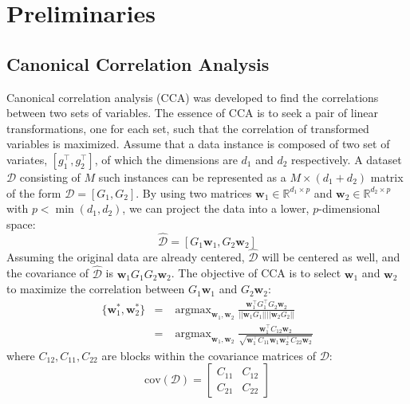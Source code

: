 \documentclass[a4paper]{article}
\newcommand{\argmax}{\mathop\mathrm{argmax}}
\begin{document}
\section{Preliminaries}
\label{sec:pre}

\subsection{Canonical Correlation Analysis}
\label{subsec:CCA}
Canonical correlation analysis (CCA) \cite{HardoonSS04} was developed to find the correlations between two sets of variables. The essence of CCA is to seek a pair of 
linear transformations, one for each set, such that the correlation of transformed variables is maximized. 
Assume that a data instance is composed of two set of variates, $[g_1^\top,g_2^\top]$, of which the dimensions are $d_1$ and $d_2$ respectively.  
A dataset $\mathcal{D}$ consisting of $M$ such instances can be represented as a $M\times (d_1+d_2)$ matrix of the form $\mathcal{D}=[G_1,G_2]$. By using two matrices 
$\mathbf{w}_1\in\mathbb{R}^{d_1\times p}$ and $\mathbf{w}_2\in\mathbb{R}^{d_2\times p}$ with $p<\min(d_1,d_2)$, we can project the data into a lower, $p$-dimensional space:
\begin{equation}
    \hat{\mathcal{D}}= [G_1\mathbf{w}_1, G_2\mathbf{w}_2] 
\end{equation}
Assuming the original data are already centered, $\hat{\mathcal{D}}$ will be centered as well, and the covariance of $\hat{\mathcal{D}}$ is $\mathbf{w}_1 G_1 G_2 \mathbf{w}_2$. 
The objective of CCA is to select $\mathbf{w}_1$ and $\mathbf{w}_2$ to maximize the correlation between $G_1\mathbf{w}_1$ and $G_2\mathbf{w}_2$:
\begin{equation}
    \begin{array}{rcl}
        \{\mathbf{w}_1^*,\mathbf{w}_2^*\} &= &\displaystyle\argmax_{\mathbf{w}_1,\mathbf{w}_2} \frac{\mathbf{w}_1^\top G_1^\top G_2 \mathbf{w}_2}{||\mathbf{w}_1 G_1||||\mathbf{w}_2 G_2||} \\ 
                                          &= & \displaystyle\argmax_{\mathbf{w}_1,\mathbf{w}_2} \frac{\mathbf{w}_1^\top C_{12} \mathbf{w}_2}{\sqrt{\mathbf{w}_1^\top C_{11} \mathbf{w}_1 \mathbf{w}_2^\top C_{22} \mathbf{w}_2}}
    \end{array}
    \label{equ:CCA1}
\end{equation}
where $C_{12}, C_{11}, C_{22}$ are blocks within the covariance matrices of $\mathcal{D}$:  
\begin{equation}
    \mathrm{cov}(\mathcal{D})=\left[\begin{array}{cc}
            C_{11} & C_{12} \\
            C_{21} & C_{22}
        \end{array}
    \right]
\end{equation}
\end{document}
